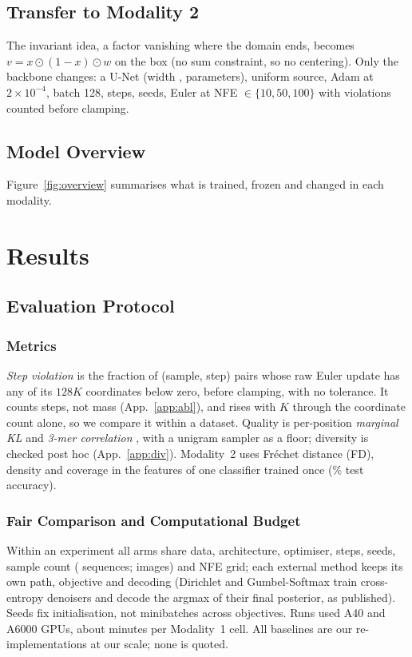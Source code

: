 \documentclass{article}
\begin{document}
\subsection{Transfer to Modality 2}
The invariant idea, a factor vanishing where the domain ends, becomes $v=x\odot(1-x)\odot w$ on the
box (no sum constraint, so no centering). Only the backbone changes: a U-Net (width \MTwoWidth, \MTwoParams{} parameters), uniform source, Adam at
$2\times10^{-4}$, batch 128, \MTwoSteps{} steps, \MTwoSeeds{} seeds, Euler at NFE
$\in\{10,50,100\}$ with violations counted before clamping.

\subsection{Model Overview}
Figure~\ref{fig:overview} summarises what is trained, frozen and changed in each modality.

\section{Results}

\subsection{Evaluation Protocol}
\subsubsection{Metrics}
\emph{Step violation} is the fraction of (sample, step) pairs whose raw Euler update has any of its
$128K$ coordinates below zero, before clamping, with no tolerance. It counts steps, not mass (App.~\ref{app:abl}),
and rises with $K$ through the coordinate count alone, so we compare it within a dataset. Quality is per-position \emph{marginal KL} and \emph{3-mer correlation}
\citep{wang2025drakes}, with a unigram sampler as a floor; diversity is checked post hoc (App.~\ref{app:div}). Modality~2 uses Fr\'echet distance (FD), density and coverage
\citep{naeem2020reliable} in the features of one classifier trained once (\MTwoAcc\% test accuracy).
\subsubsection{Fair Comparison and Computational Budget}
Within an experiment all arms share data, architecture, optimiser, steps, seeds, sample count
(\MOneEval{} sequences; \MTwoEval{} images) and NFE grid; each external method keeps its own path,
objective and decoding (Dirichlet and Gumbel-Softmax train cross-entropy denoisers and decode the
argmax of their final posterior, as published). Seeds fix initialisation, not minibatches across
objectives. Runs used A40 and A6000 GPUs, about \MOneCellMin{} minutes per Modality~1 cell. All
baselines are our re-implementations at our scale; none is quoted.
\end{document}
